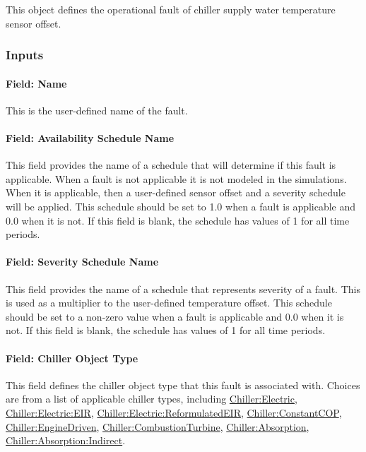 This object defines the operational fault of chiller supply water temperature sensor offset.

\subsubsection{Inputs}

\paragraph{Field: Name}

This is the user-defined name of the fault.

\paragraph{Field: Availability Schedule Name}

This field provides the name of a schedule that will determine if this fault is applicable. When a fault is not applicable it is not modeled in the simulations. When it is applicable, then a user-defined sensor offset and a severity schedule will be applied. This schedule should be set to 1.0 when a fault is applicable and 0.0 when it is not. If this field is blank, the schedule has values of 1 for all time periods.

\paragraph{Field: Severity Schedule Name}

This field provides the name of a schedule that represents severity of a fault. This is used as a multiplier to the user-defined temperature offset. This schedule should be set to a non-zero value when a fault is applicable and 0.0 when it is not. If this field is blank, the schedule has values of 1 for all time periods.

\paragraph{Field: Chiller Object Type}

This field defines the chiller object type that this fault is associated with. Choices are from a list of applicable chiller types, including \hyperref[chillerelectric]{Chiller:Electric}, \hyperref[chillerelectriceir]{Chiller:Electric:EIR}, \hyperref[chillerelectricreformulatedeir]{Chiller:Electric:ReformulatedEIR},  \hyperref[chillerconstantcop]{Chiller:ConstantCOP}, \hyperref[chillerenginedriven]{Chiller:EngineDriven}, \hyperref[chillercombustionturbine]{Chiller:CombustionTurbine}, \hyperref[chillerabsorption]{Chiller:Absorption}, \hyperref[chillerabsorptionindirect]{Chiller:Absorption:Indirect}.


